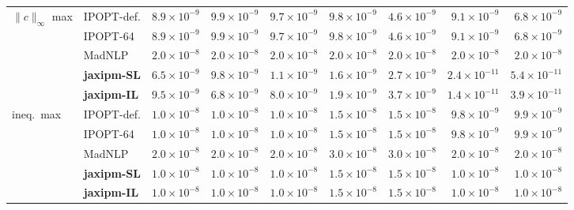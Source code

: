 \begin{table}[p]
{\begin{tabular}{@{}l l r r r r r r r@{}}
\midrule
\multirow{5}{*}{$\|c\|_\infty$ max} & IPOPT-def. & $8.9\!\times\!10^{-9}$ & $9.9\!\times\!10^{-9}$ & $9.7\!\times\!10^{-9}$ & $9.8\!\times\!10^{-9}$ & $4.6\!\times\!10^{-9}$ & $9.1\!\times\!10^{-9}$ & $6.8\!\times\!10^{-9}$ \\
 & IPOPT-64 & $8.9\!\times\!10^{-9}$ & $9.9\!\times\!10^{-9}$ & $9.7\!\times\!10^{-9}$ & $9.8\!\times\!10^{-9}$ & $4.6\!\times\!10^{-9}$ & $9.1\!\times\!10^{-9}$ & $6.8\!\times\!10^{-9}$ \\
 & MadNLP & $2.0\!\times\!10^{-8}$ & $2.0\!\times\!10^{-8}$ & $2.0\!\times\!10^{-8}$ & $2.0\!\times\!10^{-8}$ & $2.0\!\times\!10^{-8}$ & $2.0\!\times\!10^{-8}$ & $2.0\!\times\!10^{-8}$ \\
 & \textbf{jaxipm-SL} & {\boldmath$6.5\!\times\!10^{-9}$} & {\boldmath$9.8\!\times\!10^{-9}$} & {\boldmath$1.1\!\times\!10^{-9}$} & {\boldmath$1.6\!\times\!10^{-9}$} & {\boldmath$2.7\!\times\!10^{-9}$} & {\boldmath$2.4\!\times\!10^{-11}$} & {\boldmath$5.4\!\times\!10^{-11}$} \\
 & \textbf{jaxipm-IL} & {\boldmath$9.5\!\times\!10^{-9}$} & {\boldmath$6.8\!\times\!10^{-9}$} & {\boldmath$8.0\!\times\!10^{-9}$} & {\boldmath$1.9\!\times\!10^{-9}$} & {\boldmath$3.7\!\times\!10^{-9}$} & {\boldmath$1.4\!\times\!10^{-11}$} & {\boldmath$3.9\!\times\!10^{-11}$} \\
\midrule
\multirow{5}{*}{ineq.\ max} & IPOPT-def. & $1.0\!\times\!10^{-8}$ & $1.0\!\times\!10^{-8}$ & $1.0\!\times\!10^{-8}$ & $1.5\!\times\!10^{-8}$ & $1.5\!\times\!10^{-8}$ & $9.8\!\times\!10^{-9}$ & $9.9\!\times\!10^{-9}$ \\
 & IPOPT-64 & $1.0\!\times\!10^{-8}$ & $1.0\!\times\!10^{-8}$ & $1.0\!\times\!10^{-8}$ & $1.5\!\times\!10^{-8}$ & $1.5\!\times\!10^{-8}$ & $9.8\!\times\!10^{-9}$ & $9.9\!\times\!10^{-9}$ \\
 & MadNLP & $2.0\!\times\!10^{-8}$ & $2.0\!\times\!10^{-8}$ & $2.0\!\times\!10^{-8}$ & $3.0\!\times\!10^{-8}$ & $3.0\!\times\!10^{-8}$ & $2.0\!\times\!10^{-8}$ & $2.0\!\times\!10^{-8}$ \\
 & \textbf{jaxipm-SL} & {\boldmath$1.0\!\times\!10^{-8}$} & {\boldmath$1.0\!\times\!10^{-8}$} & {\boldmath$1.0\!\times\!10^{-8}$} & {\boldmath$1.5\!\times\!10^{-8}$} & {\boldmath$1.5\!\times\!10^{-8}$} & {\boldmath$1.0\!\times\!10^{-8}$} & {\boldmath$1.0\!\times\!10^{-8}$} \\
 & \textbf{jaxipm-IL} & {\boldmath$1.0\!\times\!10^{-8}$} & {\boldmath$1.0\!\times\!10^{-8}$} & {\boldmath$1.0\!\times\!10^{-8}$} & {\boldmath$1.5\!\times\!10^{-8}$} & {\boldmath$1.5\!\times\!10^{-8}$} & {\boldmath$1.0\!\times\!10^{-8}$} & {\boldmath$1.0\!\times\!10^{-8}$} \\

\end{tabular}}
\end{table}
